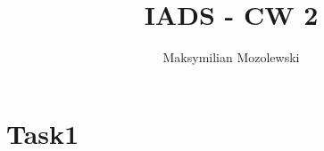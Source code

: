 \documentclass{report}
\begin{document}
\title{IADS - CW 2}
\author{Maksymilian Mozolewski}
\maketitle
\pagebreak
\section{Task1}
 
\end{document}
